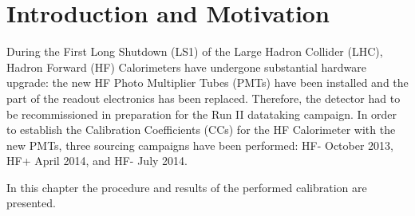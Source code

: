\section{Introduction and Motivation}
During the First Long Shutdown (LS1) of the Large Hadron Collider (LHC), Hadron Forward (HF) Calorimeters have undergone substantial hardware upgrade: the
new HF Photo Multiplier Tubes (PMTs) have been installed and the part of the readout electronics has been replaced. Therefore, the detector had to be recommissioned in preparation for the Run II datataking campaign. In order to establish the Calibration Coefficients (CCs) for the HF Calorimeter with the new PMTs, three sourcing campaigns have been performed: HF- October 2013, HF+ April 2014, and HF- July 2014.

In this chapter the procedure and results of the performed calibration are presented.

